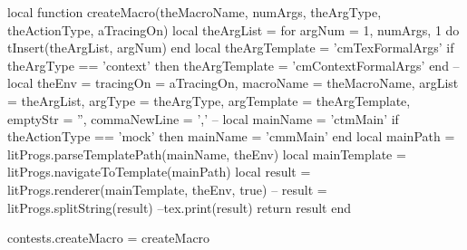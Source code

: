 \startLuaCode
local function createMacro(theMacroName,
                           numArgs,
                           theArgType,
                           theActionType,
                           aTracingOn)
  local theArgList = { }
  for argNum = 1, numArgs, 1 do
    tInsert(theArgList, argNum)
  end
  local theArgTemplate = 'cmTexFormalArgs'
  if theArgType == 'context' then
    theArgTemplate = 'cmContextFormalArgs'
  end
  --
  local theEnv   = {
    tracingOn    = aTracingOn,
    macroName    = theMacroName,
    argList      = theArgList,
    argType      = theArgType,
    argTemplate  = theArgTemplate,
    emptyStr     = '',
    commaNewLine = ',\n'
  }
  --
  local mainName   = 'ctmMain'
  if theActionType == 'mock' then
    mainName = 'cmmMain'
  end
  local mainPath     = litProgs.parseTemplatePath(mainName, theEnv)
  local mainTemplate = litProgs.navigateToTemplate(mainPath)
  local result       = litProgs.renderer(mainTemplate, theEnv, true)
  --
  result            = litProgs.splitString(result)
  --tex.print(result)
  return result
end

contests.createMacro = createMacro
\stopLuaCode


